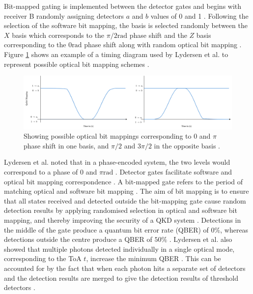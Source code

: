 Bit-mapped gating is implemented between the detector gates and begins with receiver B randomly assigning detectors $a$ and $b$ values of 0 and 1 \cite{lydersen2011secure}. Following the selection of the software bit mapping, the basis is selected randomly between the $X$ basis which corresponds to the $\pi/2 \si{\radian}$ phase shift and the $Z$ basis corresponding to the $0 \si{\radian}$ phase shift along with random optical bit mapping \cite{lydersen2011secure}. Figure \ref{fig:optical-bit-mapping} shows an example of a timing diagram used by Lydersen et al. to represent possible optical bit mapping schemes \cite{lydersen2011secure}.
\begin{figure}[!ht]
	\centering
	\includegraphics[width=1.0\linewidth]{body/ch3/figs/optical-bit-mapping}
	\caption[Timing Diagram for Possible Optical Bit Mapping Scheme by Lydersen et al.]{Showing possible optical bit mappings corresponding to $0$ and $\pi$ phase shift in one basis, and $\pi/2$ and $3\pi/2$ in the opposite basis \cite{lydersen2011secure}.}
	\label{fig:optical-bit-mapping}
\end{figure}
Lydersen et al. noted that in a phase-encoded system, the two levels would correspond to a phase of $0$ and $\pi \si{\radian}$ \cite{lydersen2011secure}. Detector gates facilitate software and optical bit mapping correspondence \cite{lydersen2011secure}. A bit-mapped gate refers to the period of matching optical and software bit mapping \cite{lydersen2011secure}. The aim of bit mapping is to ensure that all states received and detected outside the bit-mapping gate cause random detection results by applying randomised selection in optical and software bit mapping, and thereby improving the security of a QKD system \cite{lydersen2011secure}. Detections in the middle of the gate produce a quantum bit error rate (QBER) of $0\%$, whereas detections outside the centre produce a QBER of $50\%$ \cite{lydersen2011secure}. Lydersen et al. also showed that multiple photons detected individually in a single optical mode, corresponding to the ToA $t$, increase the minimum QBER \cite{lydersen2011secure}. This can be accounted for by the fact that when each photon hits a separate set of detectors and the detection results are merged to give the detection results of threshold detectors \cite{lydersen2011secure}. 

